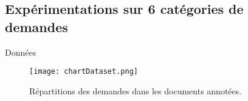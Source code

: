 \subsection{Expérimentations sur 6 catégories de demandes}
\begin{frame}{Données}
	\begin{figure}[!htb]
		\texttt{[image: chartDataset.png]}
		\caption{\tiny Répartitions des demandes dans les documents annotées.}\label{fig:quanta:hist-repartition-docs}
	\end{figure}	
\end{frame}